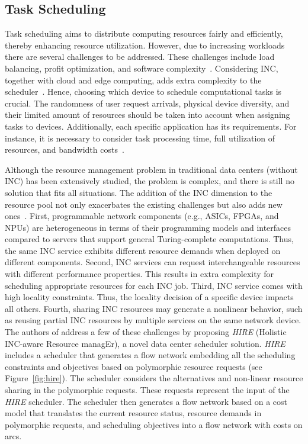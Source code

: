  \subsection{Task Scheduling}

\noindent Task scheduling aims to distribute computing resources fairly and efficiently, thereby enhancing resource utilization. However, due to increasing workloads there are several challenges to be addressed. These challenges include load balancing, profit optimization, and software complexity~\cite{TSEC}. Considering INC, together with cloud and edge computing, adds extra complexity to the scheduler~\cite{TSVNF}. Hence, choosing which device to schedule computational tasks is crucial. The randomness of user request arrivals, physical device diversity, and their limited amount of resources should be taken into account when assigning tasks to devices. Additionally, each specific application has its requirements. For instance, it is necessary to consider task processing time, full utilization of resources, and bandwidth costs~\cite{TSVNF}.

Although the resource management problem in traditional data centers (without INC) has been extensively studied, the problem is complex, and there is still no solution that fits all situations. The addition of the INC dimension to the resource pool not only exacerbates the existing challenges but also adds new ones~\cite{10.11453445814.3446760}. First, programmable network components (e.g., ASICs, FPGAs, and NPUs) are heterogeneous in terms of their programming models and interfaces compared to servers that support general Turing-complete computations. Thus, the same INC service exhibits different resource demands when deployed on different components. Second, INC services can request interchangeable resources with different performance properties. This results in extra complexity for scheduling appropriate resources for each INC job. Third, INC service comes with high locality constraints. Thus, the locality decision of a specific device impacts all others. Fourth, sharing INC resources may generate a nonlinear behavior, such as reusing partial INC resources by multiple services on the same network device. The authors of \cite{10.11453445814.3446760} address a few of these challenges by proposing \textit{HIRE} (Holistic INC-aware Resource managEr), a novel data center scheduler solution. \textit{HIRE} includes a scheduler that generates a flow network embedding all the scheduling constraints and objectives based on polymorphic resource requests (see Figure~\ref{fig:hire}). The scheduler considers the alternatives and non-linear resource sharing in the polymorphic requests. These requests represent the input of the \textit{HIRE} scheduler. The scheduler then generates a flow network based on a cost model that translates the current resource status, resource demands in polymorphic requests, and scheduling objectives into a flow network with costs on arcs.


